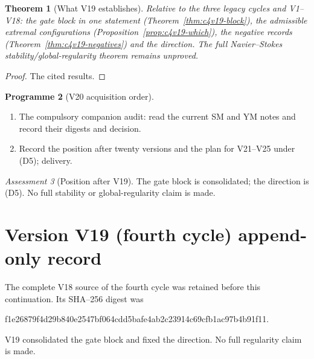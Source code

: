 \documentclass[11pt]{article}
\theoremstyle{plain}
\newtheorem{theorem}{Theorem}[section]
\theoremstyle{definition}
\newtheorem{programme}[theorem]{Programme}
\theoremstyle{remark}
\newtheorem{assessment}[theorem]{Assessment}
\begin{document}
\begin{theorem}[What V19 establishes]
\label{thm:c4v19-conclusion}
Relative to the three legacy cycles and V1--V18: the gate block in
one statement (Theorem~\ref{thm:c4v19-block}), the admissible extremal
configurations (Proposition~\ref{prop:c4v19-which}), the negative records
(Theorem~\ref{thm:c4v19-negatives}) and the direction.  The full
Navier--Stokes stability/global-regularity theorem remains
unproved.
\end{theorem}

\begin{proof}
The cited results.
\end{proof}

\begin{programme}[V20 acquisition order]
\label{prog:c4v20}
\begin{enumerate}[label=\textup{(AC\arabic*)},leftmargin=4.8em]
\item The compulsory companion audit: read the current SM and YM
      notes and record their digests and decision.
\item Record the position after twenty versions and the plan for
      V21--V25 under (D5); delivery.
\end{enumerate}
\end{programme}

\begin{assessment}[Position after V19]
\label{ass:c4v19-position}
The gate block is consolidated; the direction is (D5).  No full
stability or global-regularity claim is made.
\end{assessment}

\section*{Version V19 (fourth cycle) append-only record}

The complete V18 source of the fourth cycle was retained before this
continuation.  Its SHA--256 digest was
\begin{center}\scriptsize\ttfamily
f1e26879f4d29b840e2547bf064cdd5bafe4ab2c23914c69cfb1ac97b4b91f11.
\end{center}
V19 consolidated the gate block and fixed the direction.  No full
regularity claim is made.
\end{document}

